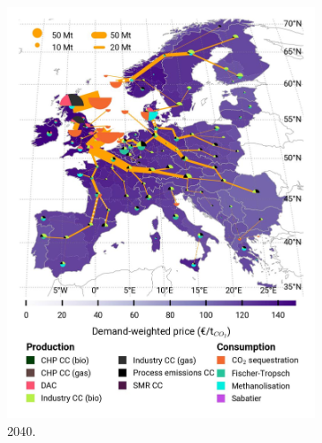 \documentclass[preprint,12pt,sort&compress]{elsarticle}
\begin{document}
\begin{figure}[htbp]
\begin{subfigure}[t]{0.33\textwidth}
      \includegraphics[width=1\textwidth]{maps/greenfield-pipelines/base_s_adm___2040-balance_map_co2_stored} 
      \caption{ 2040.}
      \label{fig:CP_lt_2040_co2}
  \end{subfigure}
  \begin{subfigure}[t]{0.33\textwidth}
      \vspace{0pt}

\end{subfigure}
\end{figure}
\end{document}
